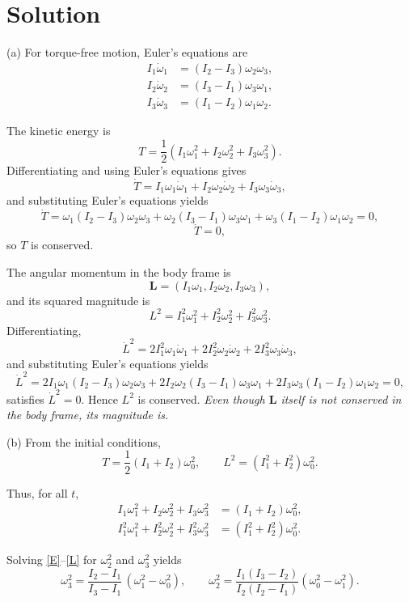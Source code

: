 \documentclass[../main.tex]{subfiles}
\begin{document}
\maketitle

\section*{Solution}

(a) For torque-free motion, Euler's equations are
\[
\begin{aligned}
I_1\dot{\omega}_1 &= (I_2-I_3)\omega_2\omega_3,\\
I_2\dot{\omega}_2 &= (I_3-I_1)\omega_3\omega_1,\\
I_3\dot{\omega}_3 &= (I_1-I_2)\omega_1\omega_2.
\end{aligned}
\]

The kinetic energy is
\[
T=\frac12\left(I_1\omega_1^2+I_2\omega_2^2+I_3\omega_3^2\right).
\]
Differentiating and using Euler’s equations gives
\[
\dot T = I_1\omega_1\dot{\omega}_1 + I_2\omega_2\dot{\omega}_2 + I_3\omega_3\dot{\omega}_3,
\]
and substituting Euler's equations yields
\[
\dot T = \omega_1(I_2-I_3)\omega_2\omega_3 + \omega_2(I_3-I_1)\omega_3\omega_1 + \omega_3(I_1-I_2)\omega_1\omega_2 = 0,
\]
\[
\dot T=0,
\]
so \(T\) is conserved.

The angular momentum in the body frame is
\[
\mathbf L=(I_1\omega_1,I_2\omega_2,I_3\omega_3),
\]
and its squared magnitude is
\[
L^2=I_1^2\omega_1^2+I_2^2\omega_2^2+I_3^2\omega_3^2.
\]
Differentiating,
\[
\dot L^2 = 2I_1^2\omega_1\dot{\omega}_1 + 2I_2^2\omega_2\dot{\omega}_2 + 2I_3^2\omega_3\dot{\omega}_3,
\]
and substituting Euler's equations yields
\[
\dot L^2 = 2I_1\omega_1(I_2-I_3)\omega_2\omega_3 + 2I_2\omega_2(I_3-I_1)\omega_3\omega_1 + 2I_3\omega_3(I_1-I_2)\omega_1\omega_2 = 0,
\]
satisfies \(\dot L^2=0\). Hence \(L^2\) is conserved. \emph{Even though \(\mathbf L\) itself is not conserved in the body frame, its magnitude is.}


(b) From the initial conditions,
\[
T=\frac12(I_1+I_2)\omega_0^2,
\qquad
L^2=(I_1^2+I_2^2)\omega_0^2.
\]

Thus, for all \(t\),
\begin{align}
I_1\omega_1^2+I_2\omega_2^2+I_3\omega_3^2
&=(I_1+I_2)\omega_0^2, \label{E}\\
I_1^2\omega_1^2+I_2^2\omega_2^2+I_3^2\omega_3^2
&=(I_1^2+I_2^2)\omega_0^2. \label{L}
\end{align}

Solving \eqref{E}--\eqref{L} for \(\omega_2^2\) and \(\omega_3^2\) yields
\[
\omega_3^2
=
\frac{I_2-I_1}{I_3-I_1}\,(\omega_1^2-\omega_0^2),
\qquad
\omega_2^2
=
\frac{I_1(I_3-I_2)}{I_2(I_2-I_1)}(\omega_0^2-\omega_1^2).
\]
\end{document}
